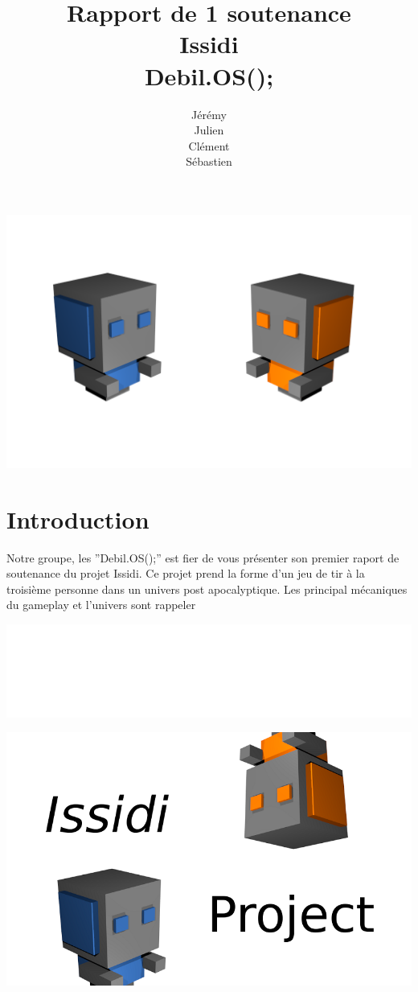 ﻿\documentclass{article}
\title{Rapport de 1\iere{} soutenance\\
		Issidi\\
		Debil.OS();}
\author{Jérémy \bsc{Beuvry}\\
		Julien \bsc{Boulicaut}\\
		Clément \bsc{Finck}\\
		Sébastien \bsc{Fleury}}
\begin{document}
\maketitle
\centerline{\includegraphics[scale=0.5]{rf.png}}
\newpage
\tableofcontents
\newpage

\section{Introduction}
Notre groupe, les ''Debil.OS();'' est fier de vous présenter son premier raport de soutenance du projet Issidi.
\newline\newline Ce projet prend la forme d'un jeu de tir à la troisième personne dans un univers post apocalyptique.  Les principal mécaniques du gameplay et l'univers sont rappeler 

\centerline{\includegraphics[scale=0.2]{latex_sa_pue.png}}
\centerline{\includegraphics[scale=0.5]{styler.png}}
\end{document}
